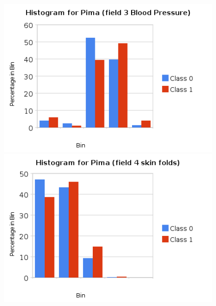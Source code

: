 \documentclass[a4paper,10pt]{article}
\begin{document}
        \begin{figure}[ht!]
          \begin{minipage}[b]{0.5\linewidth}
            \includegraphics[scale=0.45]{charts/PimaPics/P3.png}
          \end{minipage}
          \begin{minipage}[b]{0.5\linewidth}
             \includegraphics[scale=0.45]{charts/PimaPics/P4.png}
          \end{minipage}
        \end{figure}
\end{document}
